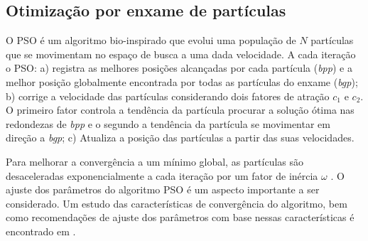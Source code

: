 \begin{comment}
\begin{algorithm}[ht]
\caption{Differential evolution optimization}
\label{alg:de}
\begin{algorithmic}
\Require $N\text{,}\:M > 0$, $\:\beta\text{,}\:P_r \in (0,1]$, $\:COST$
\Ensure The best found solution that minimizes $COST$
\For{$i = 0,\:1,\:\cdots,\:N-1$}
\For{$j = 0,\:1,\:\cdots,\:M-1$}
\State $\boldsymbol{pop}[i][j] \gets U(0.125,125.0)$
\EndFor
\EndFor

\For{$j = 0,\:1,\:\cdots,\:1250$}
\For{$i = 0,\:1,\:\cdots,\:N-1$}
\State Select in $\boldsymbol{pop}$ three random distinct candidate solutions ($\boldsymbol{\sigma_a}$, $\boldsymbol{\sigma_b}$ and $\boldsymbol{\sigma_c}$) that differ from $\boldsymbol{pop}[i]$
\State $\boldsymbol{d} \gets \boldsymbol{\sigma_a} + \beta.(\boldsymbol{\sigma_b} - \boldsymbol{\sigma_c})$
\For{$k = 0,\:1,\:\cdots,\:M-1$}
\If{$\boldsymbol{d}[k] \notin [0.125,125.0]$}
\State $\boldsymbol{d}[k] \gets U(0.125,125.0)$
\EndIf
\EndFor
\State $\boldsymbol{c} \gets \boldsymbol{pop}[i]$
\State $k \gets U(0,M-1)$
\State $c[k] \gets d[k]$
\For{$k = 0,\:1,\:\cdots,\:M-1$}
\If {$U(0,1) \leq P_r$}
  \State $c[k] \gets d[k]$
\EndIf
\EndFor

\If {\Call{$COST$}{$\boldsymbol{c}$} $<$ \Call{$COST$}{$\boldsymbol{pop}[i]$}}
 \State $\boldsymbol{pop}[i] \gets \boldsymbol{c}$
\EndIf
\EndFor
\EndFor
\end{algorithmic}
\end{algorithm}
\end{comment}

\subsection{Otimização por enxame de partículas}
 O \ac{PSO} é um algoritmo bio-inspirado que evolui uma população de $N$ partículas que se movimentam no espaço de busca a uma dada velocidade. A cada iteração o \ac{PSO}: a) registra as melhores posições alcançadas por cada partícula (\emph{bpp}) e a melhor posição globalmente encontrada por todas as partículas do enxame (\emph{bgp}); b) corrige a velocidade das partículas considerando dois fatores de atração $c_1$ e $c_2$. O primeiro fator controla a tendência da partícula procurar a solução ótima nas redondezas de \emph{bpp} e o segundo a tendência da partícula se movimentar em direção a \emph{bgp}; c) Atualiza a posição das partículas a partir das suas velocidades.
 
 Para melhorar a convergência a um mínimo global, as partículas são desaceleradas exponencialmente  a cada iteração por um fator de inércia $\omega$ \cite{Yuhui:1998}. O ajuste dos parâmetros do algoritmo \ac{PSO} é um aspecto importante a ser considerado. Um estudo das características de convergência do algoritmo, bem como recomendações de ajuste dos parâmetros com base nessas características  é encontrado em \cite{Jiang20078}.
  
